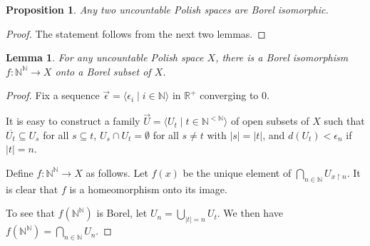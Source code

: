 \documentclass[10pt]{amsart}
\newcommand{\RR}{\mathbb{R}}
\newcommand{\NN}{\mathbb{N}}
\newtheorem{lemma}[theorem]{Lemma}
\newtheorem{proposition}[theorem]{Proposition}
\theoremstyle{definition}
\theoremstyle{remark}
\begin{document}
\begin{proposition} \label{Borel isomorphism of Polish spaces} 
Any two uncountable Polish spaces are Borel isomorphic. 
\end{proposition} 
\begin{proof} 
The statement follows from the next two lemmas. 
\end{proof} 

\begin{lemma} 
For any uncountable Polish space $X$, there is a Borel isomorphism $f\colon \NN^\NN\rightarrow X$ onto a Borel subset of $X$. 
\end{lemma} 
\begin{proof} 
Fix a sequence $\vec{\epsilon}=\langle \epsilon_i \mid i\in\NN\rangle$ in $\RR^+$ converging to $0$. 

It is easy to construct a family $\vec{U}=\langle U_t\mid t\in \NN^{<\NN}\rangle$ of open subsets of $X$ such that $\overline{U_t}\subseteq U_s$ for all $s\subseteq t$, $U_s\cap U_t=\emptyset$ for all $s\neq t$ with $|s|=|t|$, and $d(U_t)<\epsilon_n$ if $|t|=n$. 


Define $f\colon \NN^\NN\rightarrow X$ as follows. Let $f(x)$ be the unique element of $\bigcap_{n\in \NN} U_{x{\upharpoonright}n}$. It is clear that $f$ is a homeomorphism onto its image. 

To see that $f(\NN^\NN)$ is Borel, let $U_n=\bigcup_{|t|=n} U_t$. We then have $f(\NN^\NN)=\bigcap_{n\in\NN} U_n$. 
\end{proof} 
\end{document}
